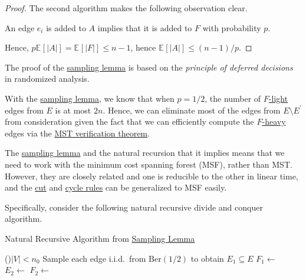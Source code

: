 \begin{proof}
	The second algorithm makes the following observation clear.
	\begin{intuition}
		An edge \(e_i\) is added to \(A\) implies that it is added to \(F\) with probability \(p\).
	\end{intuition}

	Hence, \(p \mathbb{E}_{}[\lvert A \rvert ] = \mathbb{E}_{}[\lvert F \rvert ] \leq n - 1\), hence \(\mathbb{E}_{}[\lvert A \rvert ] \leq (n - 1) / p\).
\end{proof}

\begin{remark}
	The proof of the \hyperref[lma:sampling]{sampling lemma} is based on the \emph{principle of deferred decisions} in randomized analysis.
\end{remark}

With the \hyperref[lma:sampling]{sampling lemma}, we know that when \(p = 1 / 2\), the number of \hyperref[def:light]{\(F\)-light} edges from \(E\) is at most \(2n\). Hence, we can eliminate most of the edges from \(E \setminus E^{\prime} \) from consideration given the fact that we can efficiently compute the \hyperref[def:heavy]{\(F\)-heavy} edges via the \hyperref[thm:MST-verification]{MST verification theorem}.

\begin{note}
	The \hyperref[lma:sampling]{sampling lemma} and the natural recursion that it implies means that we need to work with the minimum cost spanning forest (MSF), rather than MST. However, they are closely related and one is reducible to the other in linear time, and the \hyperref[lma:cut-rule]{cut} and \hyperref[lma:cycle-rule]{cycle rules} can be generalized to MSF easily.
\end{note}

Specifically, consider the following natural recursive divide and conquer algorithm.

\begin{algorithm}[H]\label{algo:Karger-Klein-Tarjan*}
	\DontPrintSemicolon
	\caption{Natural Recursive Algorithm from \hyperref[lma:sampling]{Sampling Lemma}}
	\BlankLine
	\If(){\(\lvert V \rvert < n_0\)}{
	}
	\;
	Sample each edge i.i.d.\ from \(\mathrm{Ber} (1 / 2)\) to obtain \(E_1 \subseteq E\)\;
	\(F_1 \gets\)\label{algo:Karger-Klein-Tarjan*-recursive-1}
	\(E_2 \gets\)
	\(F_2 \gets\)\label{algo:Karger-Klein-Tarjan*-recursive-2}
	\;
\end{algorithm}

